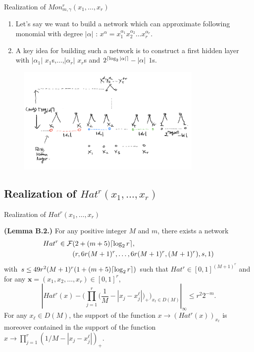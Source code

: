 \documentclass{if-beamer}
\DeclarePairedDelimiter{\ceil}{\lceil}{\rceil}
\begin{document}
\begin{frame}{Realization of $Mon_{m,\gamma}^{r}(x_{1},\dots,x_{r})$}
    \begin{enumerate}
    \item Let's say we want to build a network which can approximate following monomial with degree $|\alpha|$ : $x^{\alpha}=x_{1}^{\alpha_{1}}x_{2}^{\alpha_{2}}\dots x_{r}^{\alpha_{r}}.$
    \item A key idea for building such a network is to construct a first hidden layer with $|\alpha_{1}|$ $x_{1}$s,$\dots$,$|\alpha_{r}|$ $x_{r}$s and $2^{\ceil{\log_{2}|\alpha|}}-|\alpha|$ $1$s.
    \end{enumerate}
    
    \begin{figure}[htbp]
        \includegraphics[width=0.8\textwidth]{LemmaA4.png}
        \label{fig:figure4}
    \end{figure}
\end{frame}

\subsection{Realization of $Hat^{r}(x_{1},\dots,x_{r})$}
\begin{frame}{Realization of $Hat^{r}(x_{1},\dots,x_{r})$}
\begin{tcolorbox}
    \textbf{(Lemma B.2.)}
    For any positive integer $M$ and $m$, there exists a network 
    \begin{align*}
        Hat^{r} \in \mathcal{F}&(2+(m+5) \ceil{\log_{2}r},\\
            &(r,6r(M+1)^{r},\dots,6r(M+1)^{r},(M+1)^{r}),s,1)
    \end{align*}
    with $s\leq 49r^{2}(M+1)^{r}(1+(m+5)\ceil{\log_{2}r})$ such that $Hat^{r}\in[0,1]^{(M+1)^{r}}$ and for any $\textbf{x}=(x_{1},x_{2},\dots,x_{r})\in[0,1]^{r}$,
    \begin{equation*}
        \left| Hat^{r}(x)-\bigg(\prod_{j=1}^{r}\bigg(\frac{1}{M}-|x_j - x_j^{\ell}|\bigg)_{+} \bigg)_{x_{\ell}\in D(M)} \right|_{\infty} \leq r^{2}2^{-m}.
    \end{equation*}
    For any $x_{\ell} \in D(M)$, the support of the function $x\rightarrow{(Hat^{r}(x))_{x_\ell}}$ is moreover contained in the support of the function $x\rightarrow{\prod_{j=1}^{r}(1/M - |x_{j}-x_{j}^{\ell}|)_{+}}$.
\end{tcolorbox}

\end{frame}
\end{document}
